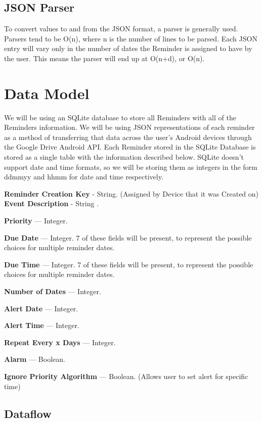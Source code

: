 \documentclass[12pt]{article}
\begin{document}
\subsection{JSON Parser}
To convert values to and from the JSON format, a parser is generally used. Parsers tend to be O(n), where n is the number of lines to be parsed. Each JSON entry will vary only in the number of dates the Reminder is assigned to have by the user. This means the parser will end up at O(n+d), or O(n).

\section{Data Model}

We will be using an SQLite database to store all Reminders with all of the Reminders information. We will be using JSON representations of each reminder as a method of transferring that data across the user's Android devices through the Google Drive Android API. Each Reminder stored in the SQLite Database is stored as a single table with the information described below. SQLite doesn’t support date and time formats, so we will be storing them as integers in the form ddmmyy and hhmm for date and time respectively.

\textbf{Reminder Creation Key} - String. (Assigned by Device that it was Created on)
\textbf{Event Description} - String .

\textbf{Priority} --- Integer.

\textbf{Due Date} --- Integer. 7 of these fields will be present, to represent the possible choices for multiple reminder dates.

\textbf{Due Time} --- Integer. 7 of these fields will be present, to represent the possible choices for multiple reminder dates.

\textbf{Number of Dates} --- Integer.

\textbf{Alert Date} --- Integer.

\textbf{Alert Time} --- Integer.

\textbf{Repeat Every x Days} --- Integer.

\textbf{Alarm} --- Boolean.

\textbf{Ignore Priority Algorithm} --- Boolean. (Allows user to set alert for specific time)



\subsection{Dataflow}
\end{document}
